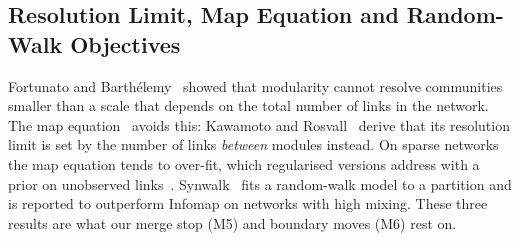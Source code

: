 \documentclass[conference]{IEEEtran}
\begin{document}
\subsection{Resolution Limit, Map Equation and Random-Walk Objectives}
Fortunato and Barth\'elemy~\cite{fortunato2007} showed that modularity cannot resolve communities smaller than a scale that depends on the total number of links in the network. The map equation~\cite{rosvall2008} avoids this: Kawamoto and Rosvall~\cite{kawamoto2015} derive that its resolution limit is set by the number of links \emph{between} modules instead. On sparse networks the map equation tends to over-fit, which regularised versions address with a prior on unobserved links~\cite{smiljanic2020}. Synwalk~\cite{toth2022} fits a random-walk model to a partition and is reported to outperform Infomap on networks with high mixing. These three results are what our merge stop (M5) and boundary moves (M6) rest on.
\end{document}
